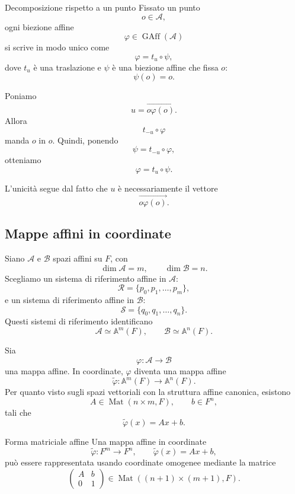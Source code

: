 \documentclass[a4paper]{article}
\begin{document}
\begin{snippetcorollary}{Decomposizione rispetto a un punto}
    Fissato un punto
    \[
        o\in\mathcal{A},
    \]
    ogni biezione affine
    \[
        \varphi\in\operatorname{GAff}(\mathcal{A})
    \]
    si scrive in modo unico come
    \[
        \varphi=t_u\circ\psi,
    \]
    dove \(t_u\) è una traslazione e \(\psi\) è una biezione affine che fissa \(o\):
    \[
        \psi(o)=o.
    \]
\end{snippetcorollary}

\begin{snippetproof}{}
    Poniamo
    \[
        u=\overrightarrow{o\varphi(o)}.
    \]
    Allora
    \[
        t_{-u}\circ\varphi
    \]
    manda \(o\) in \(o\). Quindi, ponendo
    \[
        \psi=t_{-u}\circ\varphi,
    \]
    otteniamo
    \[
        \varphi=t_u\circ\psi.
    \]

    L'unicità segue dal fatto che \(u\) è necessariamente il vettore
    \[
        \overrightarrow{o\varphi(o)}.
    \]
\end{snippetproof}

\subsection{Mappe affini in coordinate}

Siano \(\mathcal{A}\) e \(\mathcal{B}\) spazi affini su \(F\), con
\[
    \dim\mathcal{A}=m,
    \qquad
    \dim\mathcal{B}=n.
\]
Scegliamo un sistema di riferimento affine in \(\mathcal{A}\):
\[
    \mathcal{R}=\{p_0,p_1,\ldots,p_m\},
\]
e un sistema di riferimento affine in \(\mathcal{B}\):
\[
    \mathcal{S}=\{q_0,q_1,\ldots,q_n\}.
\]
Questi sistemi di riferimento identificano
\[
    \mathcal{A}\simeq\mathbb{A}^m(F),
    \qquad
    \mathcal{B}\simeq\mathbb{A}^n(F).
\]

Sia
\[
    \varphi:\mathcal{A}\to\mathcal{B}
\]
una mappa affine. In coordinate, \(\varphi\) diventa una mappa affine
\[
    \widetilde{\varphi}:\mathbb{A}^m(F)\to\mathbb{A}^n(F).
\]
Per quanto visto sugli spazi vettoriali con la struttura affine canonica, esistono
\[
    A\in\operatorname{Mat}(n\times m,F),
    \qquad
    b\in F^n,
\]
tali che
\[
    \widetilde{\varphi}(x)=Ax+b.
\]

\begin{snippetdefinition}{Forma matriciale affine}
    Una mappa affine in coordinate
    \[
        \widetilde{\varphi}:F^m\to F^n,
        \qquad
        \widetilde{\varphi}(x)=Ax+b,
    \]
    può essere rappresentata usando coordinate omogenee mediante la matrice
    \[
        \begin{pmatrix}
            A & b\\
            0 & 1
        \end{pmatrix}
        \in\operatorname{Mat}((n+1)\times(m+1),F).
    \]
\end{snippetdefinition}
\end{document}
